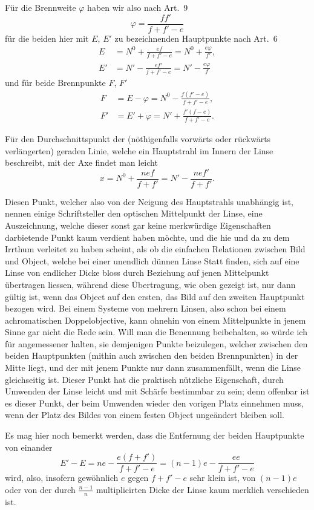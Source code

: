 \documentclass[11pt,a4paper]{article}
\begin{document}
Für die Brennweite $\varphi$ haben wir also nach Art.~9
\[
\varphi = \frac{ff'}{f + f' - e}
\]
für die beiden hier mit $E$, $E'$ zu bezeichnenden Hauptpunkte nach Art.~6
\begin{align*}
E &= N^0 + \frac{ef}{f + f' - e} = N^0 + \frac{e\varphi}{f'}, \\
E' &= N' - \frac{ef'}{f + f' - e} = N' - \frac{e\varphi}{f}
\end{align*}
und für beide Brennpunkte $F$, $F'$
\begin{align*}
F &= E - \varphi = N^0 - \frac{f(f' - e)}{f + f' - e}, \\
F' &= E' + \varphi = N' + \frac{f'(f - e)}{f + f' - e}.
\end{align*}

\newpage
\noindent
Für den Durchschnittspunkt der (nöthigenfalls vorwärts oder rückwärts verlängerten) geraden Linie, welche ein Hauptstrahl im Innern der Linse beschreibt, mit der Axe findet man leicht
\[
x = N^0 + \frac{n e f}{f + f'} = N' - \frac{n e f'}{f + f'}.
\]

Diesen Punkt, welcher also von der Neigung des Hauptstrahls unabhängig ist, nennen einige Schriftsteller den optischen Mittelpunkt der Linse, eine Auszeichnung, welche dieser sonst gar keine merkwürdige Eigenschaften darbietende Punkt kaum verdient haben möchte, und die hie und da zu dem Irrthum verleitet zu haben scheint, als ob die einfachen Relationen zwischen Bild und Object, welche bei einer unendlich dünnen Linse Statt finden, sich auf eine Linse von endlicher Dicke bloss durch Beziehung auf jenen Mittelpunkt übertragen liessen, während diese Übertragung, wie oben gezeigt ist, nur dann gültig ist, wenn das Object auf den ersten, das Bild auf den zweiten Hauptpunkt bezogen wird. Bei einem Systeme von mehrern Linsen, also schon bei einem achromatischen Doppelobjective, kann ohnehin von einem Mittelpunkte in jenem Sinne gar nicht die Rede sein. Will man die Benennung beibehalten, so würde ich für angemessener halten, sie demjenigen Punkte beizulegen, welcher zwischen den beiden Hauptpunkten (mithin auch zwischen den beiden Brennpunkten) in der Mitte liegt, und der mit jenem Punkte nur dann zusammenfällt, wenn die Linse gleichseitig ist. Dieser Punkt hat die praktisch nützliche Eigenschaft, durch Umwenden der Linse leicht und mit Schärfe bestimmbar zu sein; denn offenbar ist es dieser Punkt, der beim Umwenden wieder den vorigen Platz einnehmen muss, wenn der Platz des Bildes von einem festen Object ungeändert bleiben soll.

Es mag hier noch bemerkt werden, dass die Entfernung der beiden Hauptpunkte von einander
\[
E' - E = ne - \frac{e(f + f')}{f + f' - e} = (n-1)e - \frac{ee}{f + f' - e}
\]
wird, also, insofern gewöhnlich $e$ gegen $f + f' - e$ sehr klein ist, von $(n-1)e$ oder von der durch $\frac{n-1}{n}$ multiplicirten Dicke der Linse kaum merklich verschieden ist.
\end{document}
